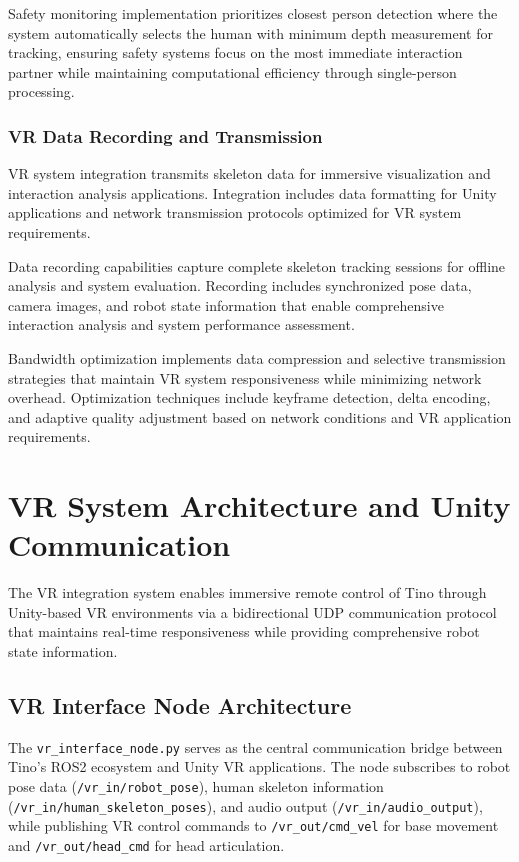 Safety monitoring implementation prioritizes closest person detection where the system automatically selects the human with minimum depth measurement for tracking, ensuring safety systems focus on the most immediate interaction partner while maintaining computational efficiency through single-person processing.

\subsubsection{VR Data Recording and Transmission}

VR system integration transmits skeleton data for immersive visualization and interaction analysis applications. Integration includes data formatting for Unity applications and network transmission protocols optimized for VR system requirements.

Data recording capabilities capture complete skeleton tracking sessions for offline analysis and system evaluation. Recording includes synchronized pose data, camera images, and robot state information that enable comprehensive interaction analysis and system performance assessment.

Bandwidth optimization implements data compression and selective transmission strategies that maintain VR system responsiveness while minimizing network overhead. Optimization techniques include keyframe detection, delta encoding, and adaptive quality adjustment based on network conditions and VR application requirements.


\section{VR System Architecture and Unity Communication}

The VR integration system enables immersive remote control of Tino through Unity-based VR environments via a bidirectional UDP communication protocol that maintains real-time responsiveness while providing comprehensive robot state information.

\subsection{VR Interface Node Architecture}

The \texttt{vr\_interface\_node.py} serves as the central communication bridge between Tino's ROS2 ecosystem and Unity VR applications. The node subscribes to robot pose data (\texttt{/vr\_in/robot\_pose}), human skeleton information (\texttt{/vr\_in/human\_skeleton\_poses}), and audio output (\texttt{/vr\_in/audio\_output}), while publishing VR control commands to \texttt{/vr\_out/cmd\_vel} for base movement and \texttt{/vr\_out/head\_cmd} for head articulation.

